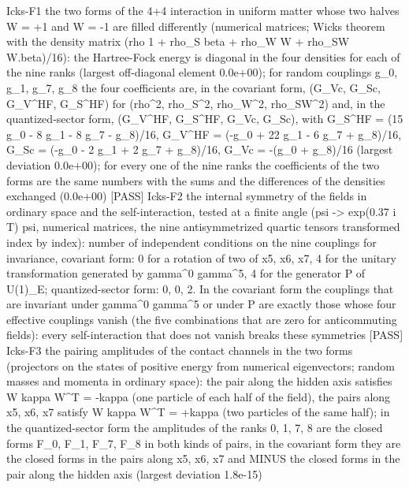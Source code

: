 \documentclass[
  10pt,
]{article}
\newenvironment{Shaded}{}{}
\newcommand{\NormalTok}[1]{#1}
\begin{document}
\begin{Shaded}
\begin{Highlighting}[]
\NormalTok{[PASS] Icks{-}F1  the two forms of the 4+4 interaction in uniform matter whose two halves W = +1 and W = {-}1 are filled differently (numerical matrices; Wick\textquotesingle{}s theorem with the density matrix (rho 1 + rho\_S beta + rho\_W W + rho\_SW W.beta)/16): the Hartree{-}Fock energy is diagonal in the four densities for each of the nine ranks (largest off{-}diagonal element 0.0e+00); for random couplings g\_0, g\_1, g\_7, g\_8 the four coefficients are, in the covariant form, (G\_Vc, G\_Sc, G\_V\^{}HF, G\_S\^{}HF) for (rho\^{}2, rho\_S\^{}2, rho\_W\^{}2, rho\_SW\^{}2) and, in the quantized{-}sector form, (G\_V\^{}HF, G\_S\^{}HF, G\_Vc, G\_Sc), with G\_S\^{}HF = (15 g\_0 {-} 8 g\_1 {-} 8 g\_7 {-} g\_8)/16, G\_V\^{}HF = ({-}g\_0 + 22 g\_1 {-} 6 g\_7 + g\_8)/16, G\_Sc = ({-}g\_0 {-} 2 g\_1 + 2 g\_7 + g\_8)/16, G\_Vc = {-}(g\_0 + g\_8)/16 (largest deviation 0.0e+00); for every one of the nine ranks the coefficients of the two forms are the same numbers with the sums and the differences of the densities exchanged (0.0e+00)}
\NormalTok{[PASS] Icks{-}F2  the internal symmetry of the fields in ordinary space and the self{-}interaction, tested at a finite angle (psi {-}\textgreater{} exp(0.37 i T) psi, numerical matrices, the nine antisymmetrized quartic tensors transformed index by index): number of independent conditions on the nine couplings for invariance, covariant form: 0 for a rotation of two of x5, x6, x7, 4 for the unitary transformation generated by gamma\^{}0 gamma\^{}5, 4 for the generator P of U(1)\_E; quantized{-}sector form: 0, 0, 2. In the covariant form the couplings that are invariant under gamma\^{}0 gamma\^{}5 or under P are exactly those whose four effective couplings vanish (the five combinations that are zero for anticommuting fields): every self{-}interaction that does not vanish breaks these symmetries}
\NormalTok{[PASS] Icks{-}F3  the pairing amplitudes of the contact channels in the two forms (projectors on the states of positive energy from numerical eigenvectors; random masses and momenta in ordinary space): the pair along the hidden axis satisfies W kappa W\^{}T = {-}kappa (one particle of each half of the field), the pairs along x5, x6, x7 satisfy W kappa W\^{}T = +kappa (two particles of the same half); in the quantized{-}sector form the amplitudes of the ranks 0, 1, 7, 8 are the closed forms F\_0, F\_1, F\_7, F\_8 in both kinds of pairs, in the covariant form they are the closed forms in the pairs along x5, x6, x7 and MINUS the closed forms in the pair along the hidden axis (largest deviation 1.8e{-}15)}

\end{Highlighting}
\end{Shaded}
\end{document}
